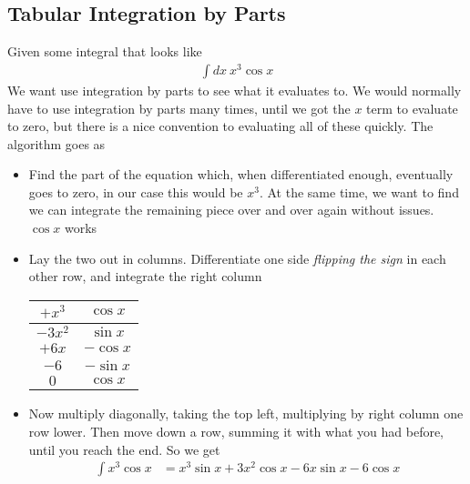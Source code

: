 \subsection{Tabular Integration by Parts}
Given some integral that looks like
\begin{align}
\int dx~x^3\cos x 
\end{align}
We want use integration by parts to see what it evaluates to. We would normally have to use integration by parts many times, until we got the $x$ term to evaluate to zero, but there is a nice convention to evaluating all of these quickly\cite{rdorst}. The algorithm goes as
\begin{itemize}
\item Find the part of the equation which, when differentiated enough, eventually goes to zero, in our case this would be $x^3$. At the same time, we want to find we can integrate the remaining piece over and over again without issues. $\cos x$ works
\item Lay the two out in columns. Differentiate one side \emph{flipping the sign} in each other row, and integrate the right column
\begin{center}
\begin{tabular}{ c c }
 $+x^3$ & $\cos x$  \\ \hline
 $-3x^2$& $\sin x$  \\  
 $+6x$ & $-\cos x$   \\
 $-6$ &  $-\sin x$ \\
 $0$ & $\cos x$
\end{tabular}
\end{center}

\item Now multiply diagonally, taking the top left, multiplying by right column one row lower. Then move down a row, summing it with what you had before, until you reach the end. So we get
\begin{align}
\int x^3\cos x &= x^3\sin x +3x^2\cos x -6x\sin x-6\cos x
\end{align}

\end{itemize}

